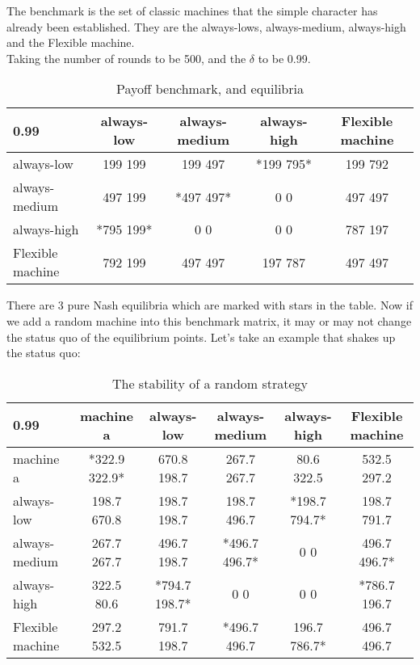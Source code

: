 \documentclass[12.5pt]{report}
\begin{document}
The benchmark is the set of classic machines that the simple character has already been established. They are the always-lows, always-medium, always-high and the Flexible machine.\\

Taking the number of rounds to be 500, and the $\delta$ to be 0.99. 

\begin{table}[h!]
\center
\begin{tabular}{l|cccc}
\textbf{0.99}& always-low & always-medium & always-high & Flexible machine\\
\hline
always-low    & 199 199 & 199 497 & *199 795*  & 199 792 \\
always-medium & 497 199 & *497 497* & 0 0      & 497 497 \\
always-high   & *795 199* & 0 0     & 0 0      & 787 197 \\
Flexible machine  & 792 199 & 497 497 & 197 787  & 497 497 \\
\end{tabular}
\caption{Payoff benchmark, and equilibria}
\end{table}

There are 3 pure Nash equilibria which are marked with stars in the table. Now if we add a random machine into this benchmark matrix, it may or may not change the status quo of the equilibrium points. Let's take an example that shakes up the status quo:
\begin{table}[h!]
\center
\begin{tabular}{l|ccccc}
\textbf{0.99}& machine a & always-low & always-medium & always-high & Flexible machine\\
\hline
machine a & *322.9 322.9* &  670.8 198.7  &  267.7 267.7  &  80.6 322.5   &  532.5 297.2  \\
always-low &   198.7 670.8  &  198.7 198.7  &  198.7 496.7 &  *198.7 794.7* &  198.7 791.7  \\
always-medium  &  267.7 267.7  &  496.7 198.7 &  *496.7 496.7*   &    0 0   &     496.7 496.7* \\
always-high &  322.5 80.6  &  *794.7 198.7*  &     0 0   &         0 0      & *786.7 196.7  \\
Flexible machine  &  297.2 532.5  &  791.7 198.7 &  *496.7 496.7  &  196.7 786.7* &  496.7 496.7  \\
\end{tabular}
\caption{The stability of a random strategy}
\end{table}
\end{document}

